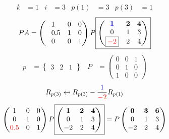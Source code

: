 \documentclass[pdf]{beamer}
\begin{document}
\begin{frame}{}\begin{align*} k &= 1 & i &= 3 & p(1) &= 3 & p(3) &= 1\end{align*} $$PA=\begin{pmatrix}1&0&0\\-0.5&1&0\\0&0&1\end{pmatrix} P \boxed{\begin{pmatrix}\mathbf{{\color{blue}1}}&\mathbf{2}&\mathbf{4}\\0&1&3\\\boxed{{\color{red}-2}}&2&4\end{pmatrix}} $$ \begin{align*} p&= \begin{Bmatrix}3&2&1\end{Bmatrix} & P&= \begin{pmatrix}0&0&1\\0&1&0\\1&0&0\end{pmatrix} \end{align*} $$R_{p(3)} \mapsfrom R_{p(3)} - \frac{{\color{blue}1}}{{\color{red}-2}} R_{p(1)}$$ $$ \begin{pmatrix}1&0&0\\0&1&0\\{\color{red}0.5}&0&1\end{pmatrix} P \boxed{\begin{pmatrix}\mathbf{1}&\mathbf{2}&\mathbf{4}\\0&1&3\\-2&2&4\end{pmatrix}} = P \begin{pmatrix}\mathbf{0}&\mathbf{3}&\mathbf{6}\\0&1&3\\-2&2&4\end{pmatrix} $$\end{frame}
\end{document}
